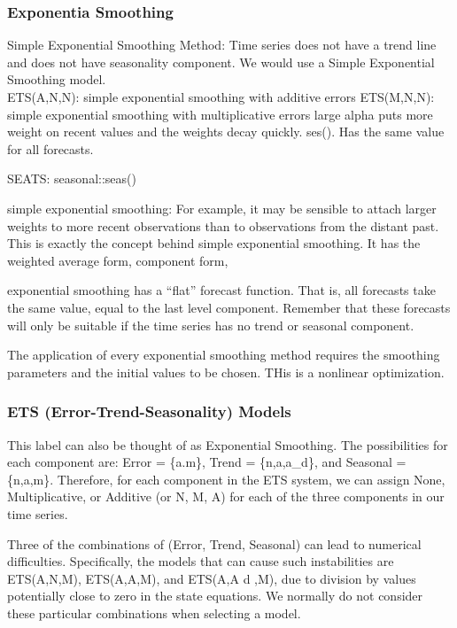 \documentclass[]{book}
\begin{document}
\subsubsection{Exponentia Smoothing}\label{exponentia-smoothing}

Simple Exponential Smoothing Method: Time series does not have a trend
line and does not have seasonality component. We would use a Simple
Exponential Smoothing model.\\
ETS(A,N,N): simple exponential smoothing with additive errors \textbar{}
ETS(M,N,N): simple exponential smoothing with multiplicative errors
large alpha puts more weight on recent values and the weights decay
quickly. ses(). Has the same value for all forecasts.

SEATS: seasonal::seas()

simple exponential smoothing: For example, it may be sensible to attach
larger weights to more recent observations than to observations from the
distant past. This is exactly the concept behind simple exponential
smoothing. It has the weighted average form, component form,

exponential smoothing has a ``flat'' forecast function. That is, all
forecasts take the same value, equal to the last level component.
Remember that these forecasts will only be suitable if the time series
has no trend or seasonal component.

The application of every exponential smoothing method requires the
smoothing parameters and the initial values to be chosen. THis is a
nonlinear optimization.

\subsubsection{ETS (Error-Trend-Seasonality)
Models}\label{ets-error-trend-seasonality-models}

This label can also be thought of as Exponential Smoothing. The
possibilities for each component are: Error = \{a.m\}, Trend =
\{n,a,a\_d\}, and Seasonal = \{n,a,m\}. Therefore, for each component in
the ETS system, we can assign None, Multiplicative, or Additive (or N,
M, A) for each of the three components in our time series.

Three of the combinations of (Error, Trend, Seasonal) can lead to
numerical difficulties. Specifically, the models that can cause such
instabilities are ETS(A,N,M), ETS(A,A,M), and ETS(A,A d ,M), due to
division by values potentially close to zero in the state equations. We
normally do not consider these particular combinations when selecting a
model.
\end{document}
